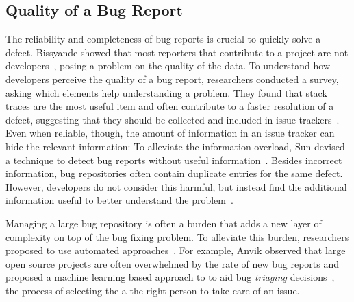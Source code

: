 \subsection{Quality of a Bug Report}

The reliability and completeness of bug reports is crucial to quickly solve a defect. Bissyande \etal showed that most reporters that contribute to a project are not developers~\cite{Biss2013}, posing a problem on the quality of the data. To understand how developers perceive the quality of a bug report, researchers conducted a survey, asking which elements help understanding a problem. They found that stack traces are the most useful item and often contribute to a faster resolution of a defect, suggesting that they should be collected and included in issue trackers~\cite{Zimm2010a,Bett2007,Schr2010a}. Even when reliable, though, the amount of information in an issue tracker can hide the relevant information: To alleviate the information overload, Sun devised a technique to detect bug reports without useful information~\cite{Sun2011}. Besides incorrect information, bug repositories often contain duplicate entries for the same defect. However, developers do not consider this harmful, but instead find the additional information useful to better understand the problem~\cite{Bett2008a}.

Managing a large bug repository is often a burden that adds a new layer of complexity on top of the bug fixing problem. To alleviate this burden, researchers proposed to use automated approaches~\cite{Weim2006}. For example, Anvik \etal observed that large open source projects are often overwhelmed by the rate of new bug reports and proposed a machine learning based approach to to aid bug \emph{triaging} decisions~\cite{Anvi2006a}, the process of selecting the a the right person to take care of an issue.



